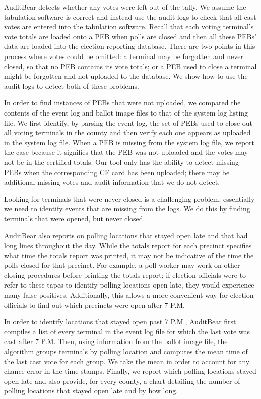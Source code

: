 \documentclass[letterpaper,twocolumn,10pt]{article}
\begin{document}
AuditBear detects whether any votes were left out of the tally. We assume the
tabulation software is correct and instead use the audit logs to check that all
cast votes are entered into the tabulation software. Recall that each voting
terminal's vote totals are loaded onto a PEB when polls are closed and then all
these PEBs' data are loaded into the election reporting database. There are two
points in this process where votes could be omitted: a terminal may be forgotten
and never closed, so that no PEB contains its vote totals; or a PEB used to
close a terminal might be forgotten and not uploaded to the database. We show
how to use the audit logs to detect both of these problems.  

In order to find instances of PEBs that were not uploaded, we
compared the contents of the event log and ballot image files to that of the
system log listing file. We first identify, by parsing the event log, the set
of PEBs used to close out all voting terminals in the county and then verify each one appears as
uploaded in the system log file. When a PEB is missing from the system log file,
we report the case because it signifies that the PEB was not uploaded and the
votes may not be in the certified totals. Our tool only has the ability to detect missing 
PEBs when the corresponding CF card has been uploaded; there may be additional missing 
votes and audit information that we do not detect.

Looking for terminals that were never closed is a challenging problem:
essentially we need to identify events that are missing from the logs. We do
this by finding terminals that were opened, but never closed.  

AuditBear also reports on polling locations that stayed open late and that had
long lines throughout the day. While the totals report for each precinct specifies 
what time the totals report was printed, it may not be indicative of the time  
the polls closed for that precinct. For example, a poll worker may work on other 
closing procedures before printing the totals report; if election officials were to 
refer to these tapes to identify polling locations open late, they would 
experience many false positives. Additionally, this allows a more convenient way for 
election officials to find out which precincts were open after 7 P.M. 

In order to 
identify locations that stayed open past 7
P.M., AuditBear first compiles a list of every terminal in the event log file
for which the last vote was cast after 7 P.M. Then, using information from the
ballot image file, the algorithm groups terminals by polling location and
computes the mean time of the last cast vote for each group. We take the mean in
order to account for any chance error in the time stamps. Finally, we report which
polling locations stayed open late and also provide, for every county, a chart
detailing the number of polling locations that stayed open late and by how
long. 
	 		
\end{document}
